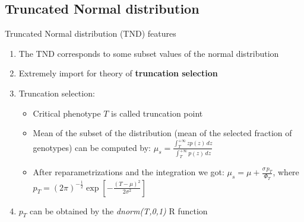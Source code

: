 \documentclass{beamer}
\begin{document}
\subsection{Truncated Normal distribution}
\begin{frame}{Truncated Normal distribution (TND) features}
  \begin{enumerate}
  
  \item<1-> The TND corresponds to some subset values of the normal distribution
  \vspace{0.2cm}
    
  \item<2-> Extremely import for theory of \textbf{truncation selection}
  \vspace{0.2cm}
  
  \item<3-> Truncation selection:
  \begin{itemize}
    \item Critical phenotype $T$ is called truncation point
    \vspace{0.2cm}
    
    \item Mean of the subset of the distribution (mean of the selected fraction of genotypes) can be computed by:    
    \vspace{0.3cm} 
    $\mu_{s} = \frac{\int_{T}^{+\infty} z p(z)\, dz}{\int_{T}^{+\infty}p(z)\, dz}$       
    
    \item After reparametrizations and the integration we got:
    $\mu_{s} = \mu + \frac{\sigma \, p_{T}}{\Phi_{T}}$, where $p_{T} = (2 \pi)^{-\frac{1}{2}} \exp\left[ - \frac{(T-\mu)^2}{2 \sigma^2} \right]$
    
  \end{itemize}
  \vspace{0.2cm}
  
  \item<4-> $p_{T}$ can be obtained by the \textit{dnorm(T,0,1)} R function
             
  \end{enumerate}
    
\end{frame}

\end{document}
